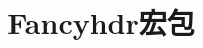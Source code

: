 ﻿\documentclass[twoside]{article}
\title{Fancyhdr宏包}
\begin{document}
\maketitle
\tableofcontents
\Blinddocument
\end{document}
